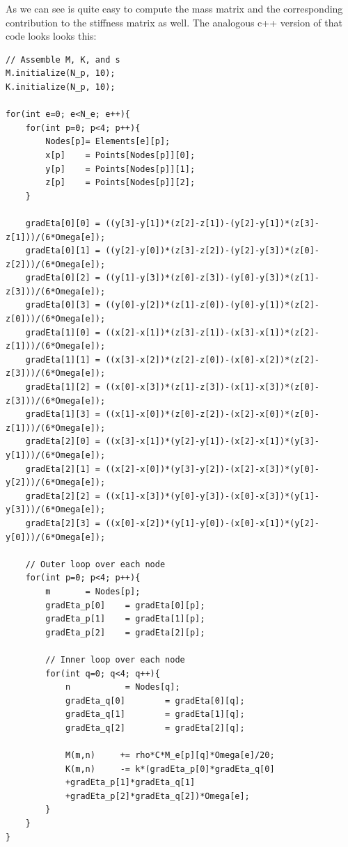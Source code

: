 \documentclass[12pt]{article}
\begin{document}
As we can see is quite easy to compute the mass matrix and the corresponding contribution to the stiffness matrix as well. The analogous c++ version of that code looks looks this: 

\begin{lstlisting}[style=MyC++Style]
// Assemble M, K, and s
M.initialize(N_p, 10);
K.initialize(N_p, 10);

for(int e=0; e<N_e; e++){
	for(int p=0; p<4; p++){
		Nodes[p]= Elements[e][p];
		x[p]	= Points[Nodes[p]][0];
		y[p]	= Points[Nodes[p]][1];
		z[p]	= Points[Nodes[p]][2]; 
	}

	gradEta[0][0] = ((y[3]-y[1])*(z[2]-z[1])-(y[2]-y[1])*(z[3]-z[1]))/(6*Omega[e]);
	gradEta[0][1] = ((y[2]-y[0])*(z[3]-z[2])-(y[2]-y[3])*(z[0]-z[2]))/(6*Omega[e]);
	gradEta[0][2] = ((y[1]-y[3])*(z[0]-z[3])-(y[0]-y[3])*(z[1]-z[3]))/(6*Omega[e]);
	gradEta[0][3] = ((y[0]-y[2])*(z[1]-z[0])-(y[0]-y[1])*(z[2]-z[0]))/(6*Omega[e]);
	gradEta[1][0] = ((x[2]-x[1])*(z[3]-z[1])-(x[3]-x[1])*(z[2]-z[1]))/(6*Omega[e]);
	gradEta[1][1] = ((x[3]-x[2])*(z[2]-z[0])-(x[0]-x[2])*(z[2]-z[3]))/(6*Omega[e]);
	gradEta[1][2] = ((x[0]-x[3])*(z[1]-z[3])-(x[1]-x[3])*(z[0]-z[3]))/(6*Omega[e]);
	gradEta[1][3] = ((x[1]-x[0])*(z[0]-z[2])-(x[2]-x[0])*(z[0]-z[1]))/(6*Omega[e]);
	gradEta[2][0] = ((x[3]-x[1])*(y[2]-y[1])-(x[2]-x[1])*(y[3]-y[1]))/(6*Omega[e]);
	gradEta[2][1] = ((x[2]-x[0])*(y[3]-y[2])-(x[2]-x[3])*(y[0]-y[2]))/(6*Omega[e]);
	gradEta[2][2] = ((x[1]-x[3])*(y[0]-y[3])-(x[0]-x[3])*(y[1]-y[3]))/(6*Omega[e]);
	gradEta[2][3] = ((x[0]-x[2])*(y[1]-y[0])-(x[0]-x[1])*(y[2]-y[0]))/(6*Omega[e]);

	// Outer loop over each node
	for(int p=0; p<4; p++){
		m		= Nodes[p];
		gradEta_p[0]	= gradEta[0][p];
		gradEta_p[1]	= gradEta[1][p];
		gradEta_p[2]	= gradEta[2][p];

		// Inner loop over each node
		for(int q=0; q<4; q++){
			n			= Nodes[q];
			gradEta_q[0]		= gradEta[0][q];
			gradEta_q[1]		= gradEta[1][q];
			gradEta_q[2]		= gradEta[2][q];

			M(m,n)	   += rho*C*M_e[p][q]*Omega[e]/20;
			K(m,n)	   -= k*(gradEta_p[0]*gradEta_q[0]
			+gradEta_p[1]*gradEta_q[1]
			+gradEta_p[2]*gradEta_q[2])*Omega[e];
		}
	}
}
\end{lstlisting}
\end{document}
